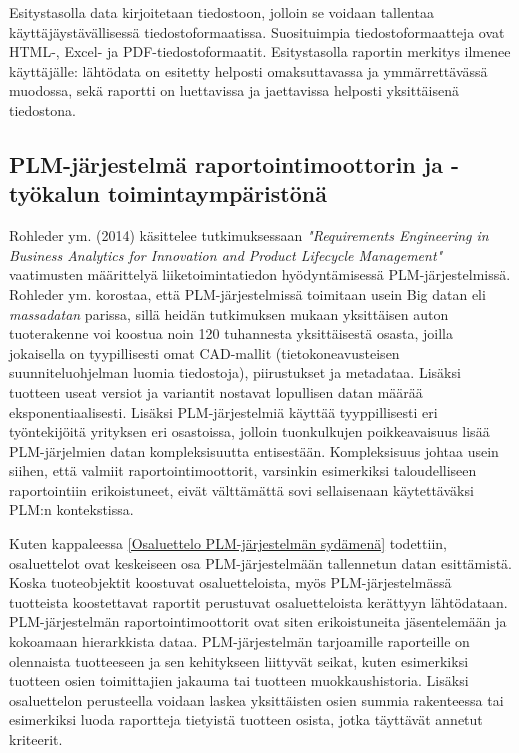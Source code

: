 Esitystasolla data kirjoitetaan tiedostoon, jolloin se voidaan tallentaa käyttäjäystävällisessä tiedostoformaatissa. \cite{he_design_2010} Suosituimpia tiedostoformaatteja ovat HTML-, Excel- ja PDF-tiedostoformaatit. \cite{he_design_2010} Esitystasolla raportin merkitys ilmenee käyttäjälle: lähtödata on esitetty helposti omaksuttavassa ja ymmärrettävässä muodossa, sekä raportti on luettavissa ja jaettavissa helposti yksittäisenä tiedostona.

\subsection{PLM-järjestelmä raportointimoottorin ja -työkalun toimintaympäristönä} \label{PLM-järjestelmä raportointimoottorin toimintaympäristönä}

Rohleder ym. (2014) käsittelee tutkimuksessaan \textit{"Requirements Engineering in Business Analytics for Innovation and Product Lifecycle Management"} vaatimusten määrittelyä liiketoimintatiedon hyödyntämisessä PLM-järjestelmissä. Rohleder ym. korostaa, että PLM-järjestelmissä toimitaan usein Big datan eli \textit{massadatan}  parissa, sillä heidän tutkimuksen mukaan yksittäisen auton tuoterakenne voi koostua noin 120 tuhannesta yksittäisestä osasta, joilla jokaisella on tyypillisesti omat CAD-mallit (tietokoneavusteisen suunniteluohjelman luomia tiedostoja), piirustukset ja metadataa. Lisäksi tuotteen useat versiot ja variantit nostavat lopullisen datan määrää eksponentiaalisesti. Lisäksi PLM-järjestelmiä käyttää tyyppillisesti eri työntekijöitä yrityksen eri osastoissa, jolloin tuonkulkujen poikkeavaisuus lisää PLM-järjelmien datan kompleksisuutta entisestään. Kompleksisuus johtaa usein siihen, että valmiit raportointimoottorit, varsinkin esimerkiksi taloudelliseen raportointiin erikoistuneet, eivät välttämättä sovi sellaisenaan käytettäväksi PLM:n kontekstissa. \cite{rohleder_requirements_2014}

Kuten kappaleessa \ref{Osaluettelo PLM-järjestelmän sydämenä} todettiin, osaluettelot ovat keskeiseen osa PLM-järjestelmään tallennetun datan esittämistä. Koska tuoteobjektit koostuvat osaluetteloista, myös PLM-järjestelmässä tuotteista koostettavat raportit perustuvat osaluetteloista kerättyyn lähtödataan. PLM-järjestelmän raportointimoottorit ovat siten erikoistuneita jäsentelemään ja kokoamaan hierarkkista dataa. \cite{rohleder_requirements_2014} PLM-järjestelmän tarjoamille raporteille on olennaista tuotteeseen ja sen kehitykseen liittyvät seikat, kuten esimerkiksi tuotteen osien toimittajien jakauma tai tuotteen muokkaushistoria. Lisäksi osaluettelon perusteella voidaan laskea yksittäisten osien summia rakenteessa tai esimerkiksi luoda raportteja tietyistä tuotteen osista, jotka täyttävät annetut kriteerit.


